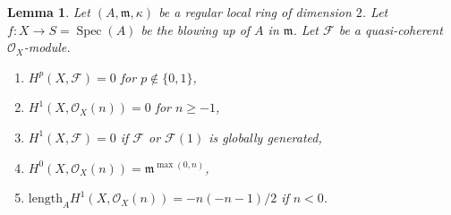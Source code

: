 \documentclass{stacks-project}
\theoremstyle{plain}
\newtheorem{lemma}[subsection]{Lemma}
\theoremstyle{definition}
\theoremstyle{remark}
\numberwithin{equation}{subsection}
\def\Spec{\mathop{\mathrm{Spec}}}
\begin{document}
\begin{lemma}
\label{lemma-cohomology-of-blowup}
Let $(A, \mathfrak m, \kappa)$ be a regular local ring of dimension $2$.
Let $f : X \to S = \Spec(A)$ be the blowing up of $A$ in $\mathfrak m$.
Let $\mathcal{F}$ be a quasi-coherent $\mathcal{O}_X$-module.
\begin{enumerate}
\item $H^p(X, \mathcal{F}) = 0$ for $p \not \in \{0, 1\}$,
\item $H^1(X, \mathcal{O}_X(n)) = 0$ for $n \geq -1$,
\item $H^1(X, \mathcal{F}) = 0$ if $\mathcal{F}$ or $\mathcal{F}(1)$
is globally generated,
\item $H^0(X, \mathcal{O}_X(n)) = \mathfrak m^{\max(0, n)}$,
\item $\text{length}_A H^1(X, \mathcal{O}_X(n)) = -n(-n - 1)/2$
if $n < 0$.
\end{enumerate}
\end{lemma}
\end{document}

